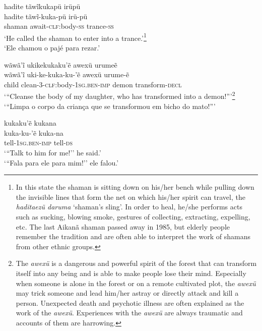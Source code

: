 \documentclass[output=paper,
modfonts,nonflat
]{langsci/langscibook}
\begin{document}
\ea   hadite tãwĩkukapü irüpü \\[.3em]
\gll 	hadite tãwĩ-kuka-pü irü-pü\\
shaman await-\textsc{clf}:body-\textsc{ss} trance-\textsc{ss}\\
\glt   `He called the shaman to enter into a trance.'\footnote{In this state the shaman is sitting down on his/her bench while pulling down the invisible lines that form the net on which his/her spirit can travel, the \textit{haditaezũ daruma} `shaman's sling'. In order to heal, he/she performs acts such as sucking, blowing smoke, gestures of collecting, extracting, expelling, etc. The last Aikanã shaman passed away in 1985, but elderly people remember the tradition and are often able to interpret the work of shamans from other ethnic groups.}\\
`Ele chamou o pajé para rezar.'\\
\z
 
\newpage 
\ea   wãwã'ĩ ukikekukaku'ẽ awexü urumeẽ \\[.3em]
\gll 	 wãwã'ĩ uki-ke-kuka-ku-'ẽ awexü urume-ẽ \\
child clean-3-\textsc{clf:}body-\textsc{1sg.ben}-\textsc{imp} demon transform-\textsc{decl} \\
\glt   `{``}Cleanse the body of my daughter, who has transformed into a demon!{''}'\footnote{The \textit{awexü} is a dangerous and powerful spirit of the forest that can transform itself into any being and is able to make people lose their mind. Especially when someone is alone in the forest or on a remote cultivated plot, the \textit{awexü} may trick someone and lead him/her astray or directly attack and kill a person. Unexpected death and psychotic illness are often explained as the work of the \textit{awexü}. Experiences with the \textit{awexü} are always traumatic and accounts of them are harrowing.}  \\
`{``}Limpa o corpo da criança que se transformou em bicho do mato!{''}'\\

\z
   
\ea   kukaku'ẽ kukana  \\[.3em]   
\gll 	 kuka-ku-'ẽ kuka-na\\
tell-\textsc{1sg.ben-imp} tell-\textsc{ds}\\
\glt   `{``}Talk to him for me!'' he said.' \\
`{``}Fala para ele para mim!'' ele falou.' \\
\z
\end{document}
